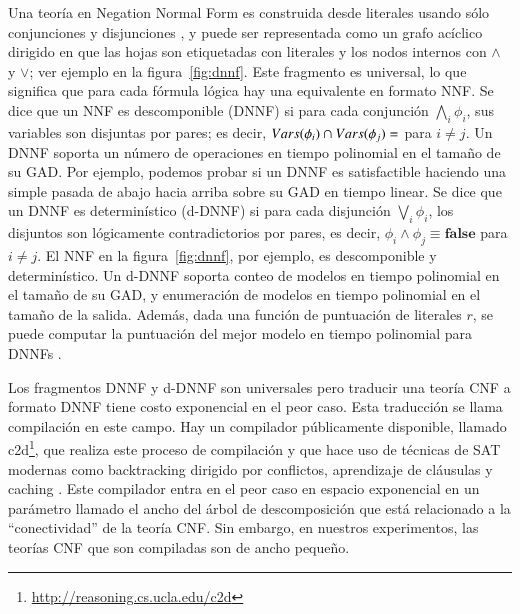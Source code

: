 Una teoría en Negation Normal Form es construida desde literales usando sólo
conjunciones y disjunciones \cite{barwise:handbook}, y puede ser representada como un grafo
acíclico dirigido en que las hojas son etiquetadas con literales y los nodos
internos con $\land$ y $\lor$; ver ejemplo en la figura~\ref{fig:dnnf}. Este
fragmento es universal, lo que significa que para cada fórmula lógica hay una
equivalente en formato NNF. Se dice que un NNF es descomponible (DNNF)
\cite{darwiche:d-dnnfs}
si para cada conjunción $\bigwedge_i\phi_i$, sus variables son disjuntas por pares; es
decir, $Vars(\phi_i)\cap Vars(\phi_j)=\empty$ para $i\neq j$. Un DNNF soporta un
número de operaciones en tiempo polinomial en el tamaño de su GAD. Por ejemplo,
podemos probar si un DNNF es satisfactible haciendo una simple pasada de abajo
hacia arriba sobre su GAD en tiempo linear. Se dice que un DNNF es
determinístico (d-DNNF) \cite{darwiche:d-dnnfs} si para cada disjunción $\bigvee_i\phi_i$, los
disjuntos son lógicamente contradictorios por pares, es decir,
$\phi_i\land\phi_j\equiv\textbf{false}$ para $i\neq j$.
El NNF en la figura~\ref{fig:dnnf}, por ejemplo, es
descomponible y determinístico. Un d-DNNF soporta conteo de modelos en
tiempo polinomial en el tamaño de su GAD, y enumeración de modelos en tiempo
polinomial en el tamaño de la salida. Además, dada una función de puntuación de
literales $r$, se puede computar la puntuación del mejor modelo en tiempo
polinomial para DNNFs \cite{darwiche:weighted}.

Los fragmentos DNNF y d-DNNF son universales pero traducir una teoría CNF a
formato DNNF tiene costo exponencial en el peor caso. Esta traducción se
llama compilación en este campo. Hay un compilador públicamente disponible,
llamado c2d\footnote{\url{http://reasoning.cs.ucla.edu/c2d}}, que realiza este proceso de compilación y que hace uso
de técnicas de SAT modernas como backtracking dirigido por conflictos,
aprendizaje de cláusulas y caching \cite{darwiche:compiler}. Este compilador entra en el peor
caso en espacio exponencial en un parámetro llamado el ancho del árbol de
descomposición que está relacionado a la ``conectividad'' de la teoría CNF.
Sin embargo, en nuestros experimentos, las teorías CNF que son compiladas son de
ancho pequeño.


